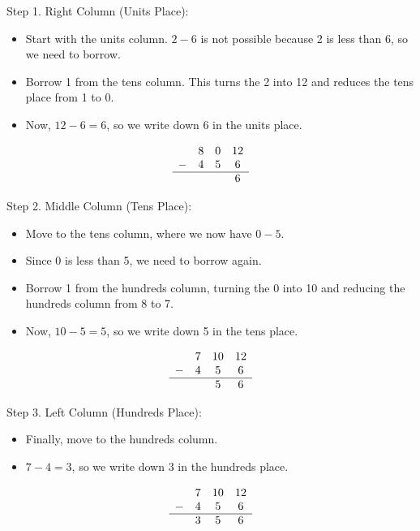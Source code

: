 \vspace{\baselineskip}\par
Step 1. Right Column (Units Place):
  \begin{itemize}
   \item Start with the units column. \( 2 - 6 \) is not possible because 2 is less than 6, so we need to borrow.
   \item  Borrow 1 from the tens column. This turns the 2 into 12 and reduces the tens place from 1 to 0.
   \item Now, \( 12 - 6 = 6 \), so we write down 6 in the units place.
   \end{itemize}
\[
\begin{array}{cccc}
    & 8 & 0 & 12 \\ %
  - & 4 & 5 & 6 \\
  \hline
    & & & 6 \\
\end{array}
\]
   

\vspace{\baselineskip}\par
Step 2. Middle Column (Tens Place):
 \begin{itemize}
   \item Move to the tens column, where we now have \( 0 - 5 \).
   \item Since 0 is less than 5, we need to borrow again.
   \item Borrow 1 from the hundreds column, turning the 0 into 10 and reducing the hundreds column from 8 to 7.
   \item Now, \( 10 - 5 = 5 \), so we write down 5 in the tens place.
   \end{itemize}
\[
\begin{array}{cccc}
    & 7 & 10 & 12 \\ %
  - & 4 & 5 & 6 \\
  \hline
    & & 5 & 6 \\
\end{array}
\]
   

\vspace{\baselineskip}\par
Step 3. Left Column (Hundreds Place):
 \begin{itemize}
   \item Finally, move to the hundreds column.
   \item \( 7 - 4 = 3 \), so we write down 3 in the hundreds place.
   \end{itemize}
\[
\begin{array}{cccc}
    & 7 & 10 & 12 \\ %
  - & 4 & 5 & 6 \\
  \hline
    & 3 & 5 & 6 \\
\end{array}
\]

